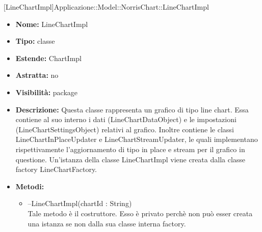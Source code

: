 			
			[LineChartImpl]{Applicazione::Model::NorrisChart::LineChartImpl}
			

	
			
			\begin{itemize}
			\item \textbf{Nome:} LineChartImpl
			\item \textbf{Tipo:} classe
			
		\item \textbf{Estende:}
		ChartImpl
		\item \textbf{Astratta:}
		no
			\item \textbf{Visibilità:} package
			\item \textbf{Descrizione:} Questa classe rappresenta un grafico di tipo line chart. Essa contiene al suo interno i dati (LineChartDataObject) e le impostazioni (LineChartSettingsObject) relativi al grafico. Inoltre contiene le classi LineChartInPlaceUpdater e LineChartStreamUpdater, le quali implementano rispettivamente l'aggiornamento di tipo in place e stream per il grafico in questione. Un'istanza della classe LineChartImpl viene creata dalla classe factory LineChartFactory.
			\item \textbf{Metodi:}
				\begin{itemize}
				\setlength{\itemsep}{5pt}
				
					\item[\ding{111}] {{--LineChartImpl(chartId : String)}} \\ [1mm] Tale metodo è il costruttore. Esso è privato perchè non può esser creata una istanza se non dalla sua classe interna factory.
				\end{itemize}
		
			\end{itemize}

